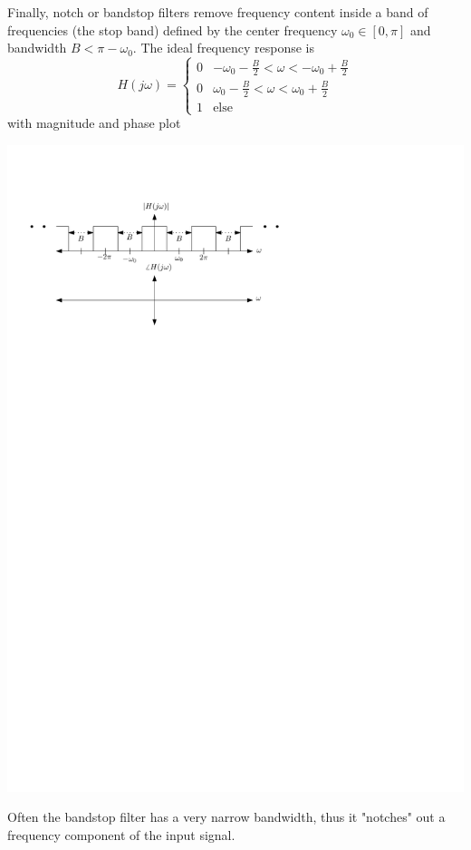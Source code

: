 Finally, notch or bandstop filters remove frequency content inside a band of frequencies (the stop band) defined by the center frequency $\omega_0\in [0,\pi]$ and bandwidth $B < \pi-\omega_0$. The ideal frequency response is
\[
H(j\omega) = \left\{ \begin{array}{lc}
  0 & -\omega_0 - \frac{B}{2} < \omega < -\omega_0+\frac{B}{2}\\[1em]
  0 & \omega_0 -\frac{B}{2} < \omega < \omega_0+\frac{B}{2}\\[1em]
  1 & \text{else}
\end{array}
\right. 
\]
with magnitude and phase plot
\begin{center}
  \includegraphics[scale=1]{graphics/bandstop-ideal-dt.pdf}
\end{center}
Often the bandstop filter has a very narrow bandwidth, thus it "notches" out a frequency component of the input signal.

